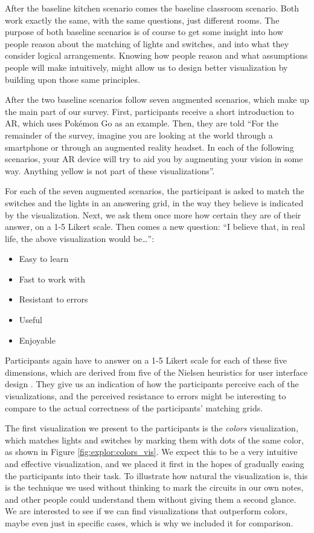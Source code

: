 After the baseline kitchen scenario comes the baseline classroom scenario. Both work exactly the same, with the same questions, just different rooms. The purpose of both baseline scenarios is of course to get some insight into how people reason about the matching of lights and switches, and into what they consider logical arrangements. Knowing how people reason and what assumptions people will make intuitively, might allow us to design better visualization by building upon those same principles.

After the two baseline scenarios follow seven augmented scenarios, which make up the main part of our survey.  First, participants receive a short introduction to AR, which uses Pokémon Go as an example. Then, they are told ``For the remainder of the survey, imagine you are looking at the world through a smartphone or through an augmented reality headset. In each of the following scenarios, your AR device will try to aid you by augmenting your vision in some way. Anything yellow is not part of these visualizations''.

For each of the seven augmented scenarios, the participant is asked to match the switches and the lights in an answering grid, in the way they believe is indicated by the visualization. Next, we ask them once more how certain they are of their answer, on a 1-5 Likert scale. Then comes a new question: ``I believe that, in real life, the above visualization would be\ldots'':
\begin{itemize}
    \item Easy to learn
    \item Fast to work with
    \item Resistant to errors
    \item Useful
    \item Enjoyable
\end{itemize}
Participants again have to answer on a 1-5 Likert scale for each of these five dimensions, which are derived from five of the Nielsen heuristics for user interface design \cite{nielsen1990heuristic}. They give us an indication of how the participants perceive each of the visualizations, and the perceived resistance to errors might be interesting to compare to the actual correctness of the participants' matching grids.

The first visualization we present to the participants is the \textit{colors} visualization, which matches lights and switches by marking them with dots of the same color, as shown in Figure \ref{fig:explor:colors_vis}. We expect this to be a very intuitive and effective visualization, and we placed it first in the hopes of gradually easing the participants into their task. To illustrate how natural the visualization is, this is the technique we used without thinking to mark the circuits in our own notes, and other people could understand them without giving them a second glance. We are interested to see if we can find visualizations that outperform colors, maybe even just in specific cases, which is why we included it for comparison.

